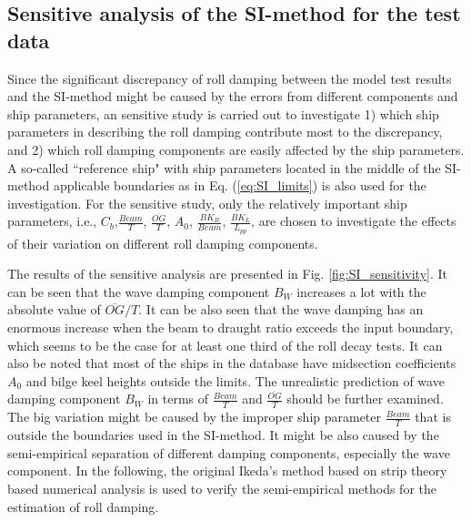 \subsection{Sensitive analysis of the SI-method for the test data}
\label{se:accuracy_SI_method}
Since the significant discrepancy of roll damping between the model test results and the SI-method might be caused by the errors from different components and ship parameters, an sensitive study is carried out to investigate 1) which ship parameters in describing the roll damping contribute most to the discrepancy, and 2) which roll damping components are easily affected by the ship parameters. A so-called ``reference ship" with ship parameters located in the middle of the SI-method applicable boundaries as in Eq. (\ref{eq:SI_limits}) is also used for the investigation. For the sensitive study, only the relatively important ship parameters, i.e., $C_b$,$\frac{Beam}{T}$, $\frac{\overline{OG}}{T}$, $A_0$, $\frac{BK_B}{Beam}$, $\frac{BK_L}{L_{pp}}$, are chosen to investigate the effects of their variation on different roll damping components. 

The results of the sensitive analysis are presented in Fig. \ref{fig:SI_sensitivity}. It can be seen that the wave damping component $B_W$ increases a lot with the absolute value of $\overline{OG}/T$. It can be also seen that the wave damping has an enormous increase when the beam to draught ratio exceeds the input boundary, which seems to be the case for at least one third of the roll decay tests. It can also be noted that most of the ships in the database have midsection coefficients $A_0$ and bilge keel heights outside the limits. The unrealistic prediction of wave damping component $B_W$ in terms of $\frac{Beam}{T}$ and $\frac{\overline{OG}}{T}$ should be further examined. The big variation might be caused by the improper ship parameter $\frac{Beam}{T}$ that is outside the boundaries used in the SI-method. It might be also caused by the semi-empirical separation of different damping components, especially the wave component. In the following, the original Ikeda's method based on strip theory based numerical analysis is used to verify the semi-empirical methods for the estimation of roll damping.  


